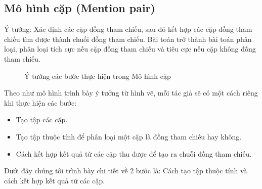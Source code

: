 \documentclass[12pt]{report}
\begin{document}
			\subsection*{Mô hình cặp (Mention pair)}
				\par Ý tưởng:  Xác định các cặp đồng tham chiếu, sau đó kết hợp các cặp đồng tham chiếu tìm được thành chuối đồng tham chiếu. Bài toán trở thành bài toán phân loại, phân loại tích cực nếu cặp đồng tham chiếu và tiêu cực nếu cặp không đồng tham chiếu.
				\begin{figure}[H]
					\centering
					
					\caption{Ý tưởng các bước thực hiện trong Mô hình cặp}
				\end{figure}
				\par Theo như mô hình trình bày ý tưởng từ hình vẽ, mỗi tác giả sẽ có một cách riêng khi thực hiện các bước:
				\begin{itemize}
					\item{Tạo tập các cặp.}
					\item{Tạo tập thuộc tính để phân loại một cặp là đồng tham chiếu hay không.}
					\item{Cách kết hợp kết quả từ các cặp thu được để tạo ra chuỗi đồng tham chiếu.}
				\end{itemize}
				\par Dưới đây chúng tôi trình bày chi tiết về 2 bước là: Cách tạo tập thuộc tính và cách kết hợp kết quả từ các cặp.
\end{document}

